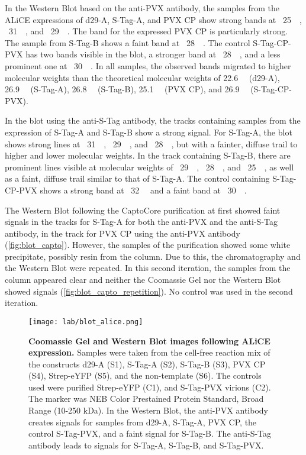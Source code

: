 In the Western Blot based on the anti-PVX antibody, the samples from the ALiCE expressions of d29-A, S-Tag-A, and PVX CP show strong bands at ~\SI{25}{\kilo\Dalton}, ~\SI{31}{\kilo\Dalton}, and ~\SI{29}{\kilo\Dalton}. The band for the expressed PVX CP is particularly strong. The sample from S-Tag-B shows a faint band at ~\SI{28}{\kilo\Dalton}. The control S-Tag-CP-PVX has two bands visible in the blot, a stronger band at ~\SI{28}{\kilo\Dalton}, and a less prominent one at ~\SI{30}{\kilo\Dalton}. In all samples, the observed bands migrated to higher molecular weights than the theoretical molecular weights of \SI{22.6}{\kilo\Dalton} (d29-A), \SI{26.9}{\kilo\Dalton} (S-Tag-A), \SI{26.8}{\kilo\Dalton} (S-Tag-B), \SI{25.1}{\kilo\Dalton} (PVX CP), and \SI{26.9}{\kilo\Dalton} (S-Tag-CP-PVX).

In the blot using the anti-S-Tag antibody, the tracks containing samples from the expression of S-Tag-A and S-Tag-B show a strong signal. For S-Tag-A, the blot shows strong lines at ~\SI{31}{\kilo\Dalton}, ~\SI{29}{\kilo\Dalton}, and ~\SI{28}{\kilo\Dalton}, but with a fainter, diffuse trail to higher and lower molecular weights. In the track containing S-Tag-B, there are prominent lines visible at molecular weights of ~\SI{29}{\kilo\Dalton}, ~\SI{28}{\kilo\Dalton}, and ~\SI{25}{\kilo\Dalton}, as well as a faint, diffuse trail similar to that of S-Tag-A. The control containing S-Tag-CP-PVX shows a strong band at ~\SI{32}{\kilo\Dalton} and a faint band at ~\SI{30}{\kilo\Dalton}.

The Western Blot following the CaptoCore purification at first showed faint signals in the tracks for S-Tag-A for both the anti-PVX and the anti-S-Tag antibody, in the track for PVX CP using the anti-PVX antibody (\autoref{fig:blot_capto}). However, the samples of the purification showed some white precipitate, possibly resin from the column. Due to this, the chromatography and the Western Blot were repeated. In this second iteration, the samples from the column appeared clear and neither the Coomassie Gel nor the Western Blot showed signals (\autoref{fig:blot_capto_repetition}). No control was used in the second iteration.


\begin{figure}
\texttt{[image: lab/blot\_alice.png]}
\caption{\textbf{Coomassie Gel and Western Blot images following ALiCE expression.} Samples were taken from the cell-free reaction mix of the constructs d29-A (S1), S-Tag-A (S2), S-Tag-B (S3), PVX CP (S4), Strep-eYFP (S5), and the non-template (S6). The controls used were purified Strep-eYFP (C1), and S-Tag-PVX virions (C2). The marker was NEB Color Prestained Protein Standard, Broad Range (10-250 kDa). In the Western Blot, the anti-PVX antibody creates signals for samples from d29-A, S-Tag-A, PVX CP, the control S-Tag-PVX, and a faint signal for S-Tag-B. The anti-S-Tag antibody leads to signals for S-Tag-A, S-Tag-B, and S-Tag-PVX. }
\label{fig:blot_alice}
\end{figure}

